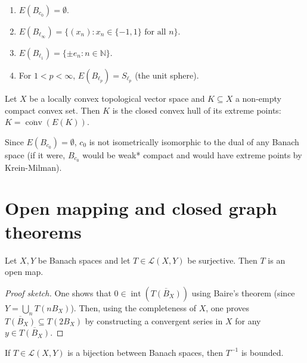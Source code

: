 \begin{example}
\label{example-extreme-points}
\begin{enumerate}
\item $E(B_{c_0}) = \emptyset$.
\item $E(B_{\ell_\infty}) = \{ (x_n) : x_n
\in \{-1, 1\} \text{ for all } n \}$.
\item $E(B_{\ell_1}) = \{ \pm e_n : n \in
\mathbb{N} \}$.
\item For $1 < p < \infty$, $E(B_{\ell_p}) =
S_{\ell_p}$ (the unit sphere).
\end{enumerate}
\end{example}

\begin{theorem}
\label{theorem-krein-milman}
Let $X$ be a locally convex topological
vector space and $K \subseteq X$ a non-empty
compact convex set. Then $K$ is the closed
convex hull of its extreme points: $K =
\overline{\operatorname{conv}}(E(K))$.
\end{theorem}

\begin{lemma}
\label{lemma-c0-not-dual}
Since $E(B_{c_0}) = \emptyset$, $c_0$ is not
isometrically isomorphic to the dual of any
Banach space (if it were, $B_{c_0}$ would be
weak* compact and would have extreme points
by Krein-Milman).
\end{lemma}

\section
{Open mapping and closed graph theorems}
\label{section-open-mapping-closed-graph}

\begin{theorem}
\label{theorem-open-mapping}
Let $X, Y$ be Banach spaces and let $T \in
\mathcal L(X,Y)$ be surjective. Then $T$ is
an open map.
\end{theorem}

\begin{proof}[Proof sketch]
One shows that $0 \in
\operatorname{int}(\overline{T(B_X)})$ using
Baire's theorem (since $Y = \bigcup_n T(n
B_X)$). Then, using the completeness of $X$,
one proves $\overline{T(B_X)} \subseteq T(2
B_X)$ by constructing a convergent series in
$X$ for any $y \in \overline{T(B_X)}$.
\end{proof}

\begin{proposition}
\label{proposition-bounded-inverse}
If $T \in \mathcal L(X,Y)$ is a bijection
between Banach spaces, then $T^{-1}$ is
bounded.
\end{proposition}

